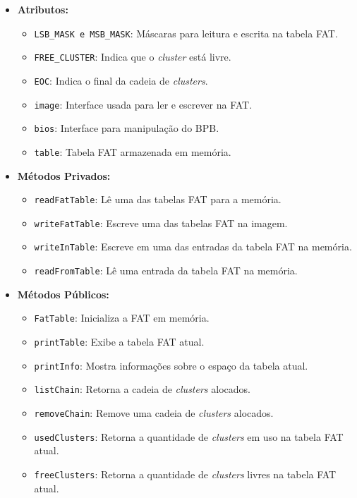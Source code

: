 \documentclass[
    12pt,				%
    oneside,   	        %
    a4paper,			%
    english,			%
    french,				%
    spanish,			%
    brazil,				%
    ]{pacotes/abntex2}
\begin{document}
\begin{itemize}
    \item \textbf{Atributos:}
        \begin{itemize}
            \item \texttt{LSB\_MASK e MSB\_MASK}: Máscaras para leitura e escrita na tabela FAT.
            \item \texttt{FREE\_CLUSTER}: Indica que o \textit{cluster} está livre.
            \item \texttt{EOC}: Indica o final da cadeia de \textit{clusters}.
            \item \texttt{image}: Interface usada para ler e escrever na FAT.
            \item \texttt{bios}: Interface para manipulação do BPB.
            \item \texttt{table}: Tabela FAT armazenada em memória.
        \end{itemize}
    \item \textbf{Métodos Privados:}
        \begin{itemize}
            \item \texttt{readFatTable}: Lê uma das tabelas FAT para a memória.
            \item \texttt{writeFatTable}: Escreve uma das tabelas FAT na imagem.
            \item \texttt{writeInTable}: Escreve em uma das entradas da tabela FAT na memória.
            \item \texttt{readFromTable}: Lê uma entrada da tabela FAT na memória.
        \end{itemize}
    \item \textbf{Métodos Públicos:}
        \begin{itemize}
            \item \texttt{FatTable}: Inicializa a FAT em memória.
            \item \texttt{printTable}: Exibe a tabela FAT atual.
            \item \texttt{printInfo}: Mostra informações sobre o espaço da tabela atual.
            \item \texttt{listChain}: Retorna a cadeia de \textit{clusters} alocados.
            \item \texttt{removeChain}: Remove uma cadeia de \textit{clusters} alocados.
            \item \texttt{usedClusters}: Retorna a quantidade de \textit{clusters} em uso na tabela FAT atual.
            \item \texttt{freeClusters}: Retorna a quantidade de \textit{clusters} livres na tabela FAT atual.

\end{itemize}
\end{itemize}
\end{document}
